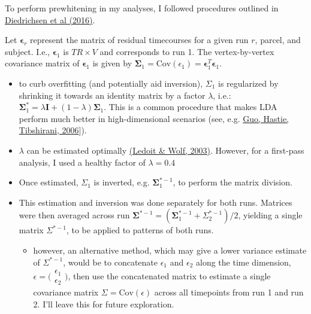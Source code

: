 \documentclass{article}\usepackage[]{graphicx}\usepackage[]{color}
\begin{document}
To perform prewhitening in my analyses, I followed procedures outlined in \href{https://arxiv.org/abs/1607.01371}{Diedrichsen et al (2016)}.

Let $\mathbf{\epsilon}_r$ represent the matrix of residual timecourses for a given run $r$, parcel, and subject.
I.e., $\mathbf{\epsilon}_1$ is $TR \times V$ and corresponds to run 1.
The vertex-by-vertex covariance matrix of $\mathbf{\epsilon}_1$ is given by $\mathbf{\Sigma}_1 = \text{Cov}(\epsilon_1) = \mathbf{\epsilon}_1^T\mathbf{\epsilon}_1$.

\begin{itemize}
  \item to curb overfitting (and potentially aid inversion), $\Sigma_1$ is regularized by shrinking it towards an identity matrix by a factor $\lambda$, i.e.: 
    $\mathbf{\Sigma}^*_1 = \lambda \mathbf{I} + (1 - \lambda) \mathbf{\Sigma}_1$.
    This is a common procedure that makes LDA perform much better in high-dimensional scenarios (see, e.g. \href{https://doi.org/10.1093/biostatistics/kxj035}{Guo, Hastie, Tibshirani, 2006}]).
  \item $\lambda$ can be estimated optimally \href{https://repositori.upf.edu/bitstream/handle/10230/560/691.pdf}{(Ledoit \& Wolf, 2003)}.
    However, for a first-pass analysis, I used a healthy factor of $\lambda = 0.4$
  \item Once estimated, $\Sigma_1$ is inverted, e.g. $\mathbf{\Sigma}^{*-1}_1$, to perform the matrix division.
  \item This estimation and inversion was done separately for both runs. Matrices were then averaged across run
    $\mathbf{\Sigma}^{*-1} = (\mathbf{\Sigma}^{*-1}_1 + \Sigma^{*-1}_2)/2$, yielding a single matrix $\Sigma^{*-1}$, to be applied to patterns of both runs.
    \begin{itemize}
      \item however, an alternative method, which may give a lower variance estimate of $\Sigma^{*-1}$, would be to concatenate $\epsilon_1$ and $\epsilon_2$ along the time dimension,
        $\epsilon = \big(\begin{smallmatrix}
        \epsilon_1\\
        \epsilon_2
        \end{smallmatrix}\big)$,
        then use the concatenated matrix to estimate a single covariance matrix $\Sigma = \text{Cov}(\epsilon)$ across all timepoints from run 1 and run 2.
        I'll leave this for future exploration.
    \end{itemize}
\end{itemize}
\end{document}
